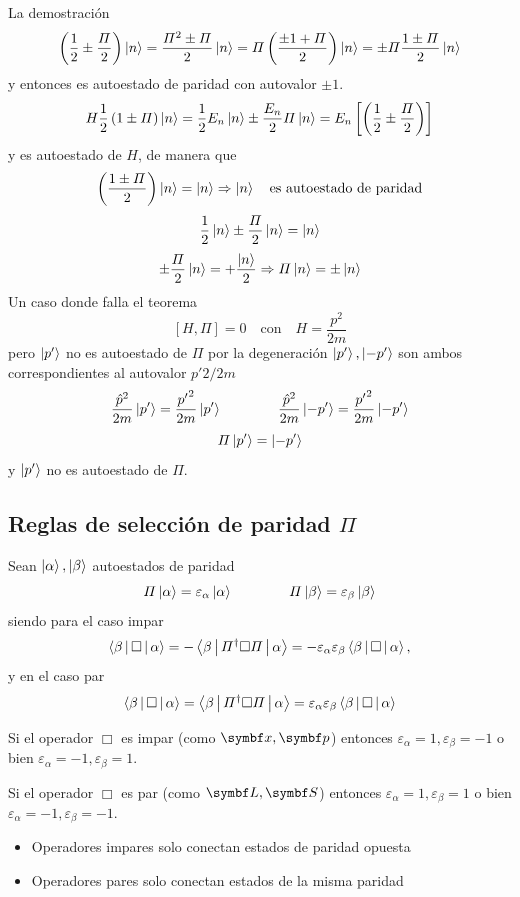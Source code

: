 \documentclass[10pt,oneside]{CBFT_book}
\begin{document}
La demostración 
\[
	\left(\frac{1}{2}\pm \frac{\Pi}{2}\right)\Ket{n} = \frac{\Pi^2\pm\Pi}{2}\Ket{n} = 
	\Pi \left( \frac{\pm 1+\Pi}{2}\right)\Ket{n} = \pm\Pi \frac{1\pm\Pi}{2}\Ket{n}
\]
y entonces es autoestado de paridad con autovalor $\pm 1$. 
\[
	H\frac{1}{2}\left(1\pm\Pi\right)\Ket{n} = \frac{1}{2}E_n\Ket{n} \pm \frac{E_n}{2}\Pi\Ket{n} =
	E_n\left[ \left( \frac{1}{2} \pm \frac{\Pi}{2}\right) \right]
\]
y es autoestado de $H$, de manera que 
\[
	\left( \frac{1\pm\Pi}{2}\right)\Ket{n} = \Ket{n} \Rightarrow \Ket{n} \quad \text{es autoestado de 
paridad}
\]
\[
	\frac{1}{2}\Ket{n} \pm \frac{\Pi}{2}\Ket{n} = \Ket{n}
\]
\[
	\pm \frac{\Pi}{2}\Ket{n} = +\frac{\Ket{n}}{2} \Rightarrow \Pi\Ket{n} = \pm\Ket{n}
\]
Un caso donde falla el teorema 
\[
	[H,\Pi]=0 \quad \text{con} \quad H=\frac{p^2}{2m} 
\]
pero $\Ket{p'}$ no es autoestado de $\Pi$ por la degeneración $\Ket{p'},\Ket{-p'}$ son ambos correspondientes 
al autovalor $p'2/2m$
\[
	\frac{\hat{p}^2}{2m}\Ket{p'} = \frac{{p'}^2}{2m}\Ket{p'} \qquad  \qquad 
	\frac{\hat{p}^2}{2m}\Ket{-p'} = \frac{{p'}^2}{2m}\Ket{-p'}
\]
\[
	\Pi\Ket{p'}= \Ket{-p'}
\]
y $\Ket{p'}$ no es autoestado de $\Pi$.

\subsection{Reglas de selección de paridad $\Pi$}

Sean $\Ket{\alpha}, \Ket{\beta}$ autoestados de paridad 
\[
	\Pi\Ket{\alpha} = \varepsilon_\alpha \Ket{\alpha} \qquad\qquad
	\Pi\Ket{\beta} = \varepsilon_\beta \Ket{\beta}
\]
siendo para el caso impar
\[
	\Braket{\beta|\Box|\alpha} = - \Braket{\beta|\Pi^\dagger\Box\Pi|\alpha} =
	-\varepsilon_\alpha \varepsilon_\beta \Braket{\beta|\Box|\alpha},
\]
y en el caso par
\[
	\Braket{\beta|\Box|\alpha} = \Braket{\beta|\Pi^\dagger\Box\Pi|\alpha} =
	\varepsilon_\alpha \varepsilon_\beta \Braket{\beta|\Box|\alpha}
\]

Si el operador $\Box$ es impar (como $\vb{x}, \vb{p}$) entonces $\varepsilon_\alpha=1,
\varepsilon_\beta=-1$ o bien $\varepsilon_\alpha=-1,\varepsilon_\beta=1$.

Si el operador $\Box$ es par (como $\vb{L}, \vb{S}$) entonces $\varepsilon_\alpha=1,
\varepsilon_\beta=1$ o bien $\varepsilon_\alpha=-1,\varepsilon_\beta=-1$.

\begin{itemize}
 \item Operadores impares solo conectan estados de paridad opuesta
 \item Operadores pares solo conectan estados de la misma paridad 
\end{itemize}
\end{document}
